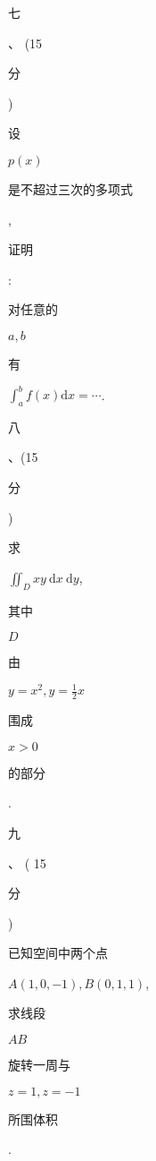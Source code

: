 \documentclass[10pt]{article}
\begin{document}
\begin{CJK}{UTF8}{mj}七\end{CJK}、 (15 \begin{CJK}{UTF8}{mj}分\end{CJK}) \begin{CJK}{UTF8}{mj}设\end{CJK} $p(x)$ \begin{CJK}{UTF8}{mj}是不超过三次的多项式\end{CJK}, \begin{CJK}{UTF8}{mj}证明\end{CJK}: \begin{CJK}{UTF8}{mj}对任意的\end{CJK} $a, b$ \begin{CJK}{UTF8}{mj}有\end{CJK} $\int_{a}^{b} f(x) \mathrm{d} x=\cdots$.

\begin{CJK}{UTF8}{mj}八\end{CJK}、(15 \begin{CJK}{UTF8}{mj}分\end{CJK}) \begin{CJK}{UTF8}{mj}求\end{CJK} $\iint_{D} x y \mathrm{~d} x \mathrm{~d} y$, \begin{CJK}{UTF8}{mj}其中\end{CJK} $D$ \begin{CJK}{UTF8}{mj}由\end{CJK} $y=x^{2}, y=\frac{1}{2} x$ \begin{CJK}{UTF8}{mj}围成\end{CJK} $x>0$ \begin{CJK}{UTF8}{mj}的部分\end{CJK}.

\begin{CJK}{UTF8}{mj}九\end{CJK}、 ( 15 \begin{CJK}{UTF8}{mj}分\end{CJK}) \begin{CJK}{UTF8}{mj}已知空间中两个点\end{CJK} $A(1,0,-1), B(0,1,1)$, \begin{CJK}{UTF8}{mj}求线段\end{CJK} $A B$ \begin{CJK}{UTF8}{mj}旋转一周与\end{CJK} $z=1, z=-1$ \begin{CJK}{UTF8}{mj}所围体积\end{CJK}.
\end{document}
